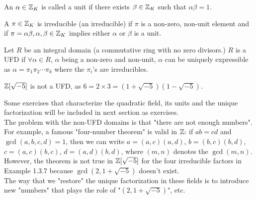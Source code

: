 \documentclass[12pt,twoside=semi,openright,numbers=noenddot]{scrbook}
\begin{document}
\begin{definition}[Unit]
    An $\alpha \in \mathbb Z_K$ is called a unit if there exists $\beta \in \mathbb Z_K$ such that 
    $\alpha \beta = 1$.    
\end{definition}
\begin{definition}[Irreducible]
    A $\pi \in \mathbb Z_K$ is irreducible (an irreducible) if $\pi$ is a non-zero, non-unit element and if 
    $\pi = \alpha\beta, \alpha, \beta \in \mathbb Z_K$ implies either $\alpha$ or $\beta$ is a unit.
\end{definition}
\begin{definition}
    Let $R$ be an integral domain (a commutative ring with no zero divisors.) $R$ is a UFD if 
    $\forall \alpha \in R$, $\alpha$ being a non-zero and non-unit, $\alpha$ can be uniquely expressible 
    as $\alpha = \pi_1\pi_2\cdots\pi_k$ where the $\pi_i$'s are irreducibles.
\end{definition}
    \begin{example}
        $\mathbb Z[\sqrt{-5}]$ is not a UFD, as $6 = 2\times 3 = (1+\sqrt{-5})(1-\sqrt{-5})$.
    \end{example}

Some exercises that characterize the quadratic field, its units and the unique factorization will be included in next section 
as exercises. \\
\newline
The problem with the non-UFD domains is that "there are not enough numbers". For example, a famous "four-number theorem"
is valid in $\mathbb Z$: if $ab = cd$ and $\gcd(a,b,c,d) = 1$, then we can write 
$a = (a,c)(a,d)$, $b=(b,c)(b,d)$, $c=(a,c)(b,c)$, $d=(a,d)(b,d)$, where $(m,n)$ denotes the 
$\gcd(m,n)$. However, the theorem is not true in 
$\mathbb Z[\sqrt{-5}]$ for the four irreducible factors in Example 1.3.7 because $\gcd(2, 1+\sqrt{-5})$ doesn't exist. \\
The way that we "restore" the unique factorization in these fields is to introduce new "numbers" that plays the role of 
"$(2, 1+\sqrt{-5})$", etc. 
\end{document}
